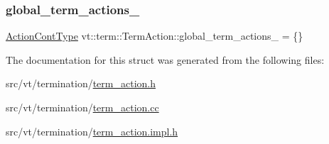 \subsubsection{\texorpdfstring{global\+\_\+term\+\_\+actions\+\_\+}{global\_term\_actions\_}}
{\footnotesize\ttfamily \hyperlink{structvt_1_1term_1_1_term_action_a3b7ff49ce82fc33a7a1ebda8797c02b7}{Action\+Cont\+Type} vt\+::term\+::\+Term\+Action\+::global\+\_\+term\+\_\+actions\+\_\+ = \{\}\hspace{0.3cm}{\ttfamily [protected]}}



The documentation for this struct was generated from the following files\+:\begin{DoxyCompactItemize}
\item 
src/vt/termination/\hyperlink{term__action_8h}{term\+\_\+action.\+h}\item 
src/vt/termination/\hyperlink{term__action_8cc}{term\+\_\+action.\+cc}\item 
src/vt/termination/\hyperlink{term__action_8impl_8h}{term\+\_\+action.\+impl.\+h}\end{DoxyCompactItemize}
